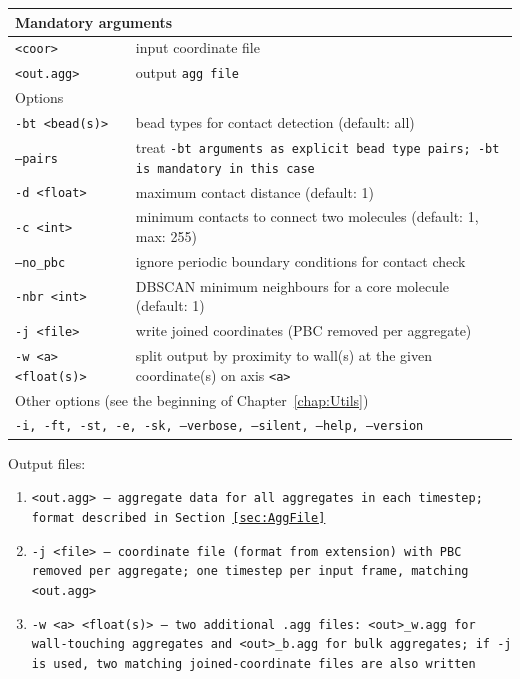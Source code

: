 \noindent
\begin{longtable}{p{}p{}}
  \toprule
  \multicolumn{2}{l}{Mandatory arguments}\\
  \midrule
  \tt{<coor>}            & input coordinate file\\
  \tt{<out.agg>}         & output \tt{agg} file\\
  \toprule
  \multicolumn{2}{l}{Options}\\
  \midrule
  \tt{-bt <bead(s)>}     & bead types for contact detection (default: all)\\
  \tt{--pairs}           & treat \tt{-bt} arguments as explicit bead type
                           pairs; \tt{-bt} is mandatory in this case\\
  \tt{-d <float>}        & maximum contact distance (default: 1)\\
  \tt{-c <int>}          & minimum contacts to connect two molecules
                           (default: 1, max: 255)\\
  \tt{--no_pbc}          & ignore periodic boundary conditions for contact
                           check\\
  \tt{-nbr <int>}        & DBSCAN minimum neighbours for a core molecule
                           (default: 1)\\
  \tt{-j <file>}         & write joined coordinates (PBC removed per
                           aggregate)\\
  \tt{-w <a> <float(s)>} & split output by proximity to wall(s) at the given
                           coordinate(s) on axis \tt{<a>}\\
  \midrule
  \multicolumn{2}{l}{Other options (see the beginning of
                     Chapter~\ref{chap:Utils})}\\
  \midrule
  \multicolumn{2}{p{0.948\textwidth}}{\tt{-i},
                     \tt{-ft},
                     \tt{-st},
                     \tt{-e},
                     \tt{-sk},
                     \tt{--verbose},
                     \tt{--silent},
                     \tt{--help},
                     \tt{--version}}\\
  \bottomrule
\end{longtable}

\noindent
Output files:
\begin{enumerate}[nosep,leftmargin=20pt]
  \item \tt{<out.agg>} -- aggregate data for all aggregates in each timestep;
    format described in Section~\ref{sec:AggFile}
  \item \tt{-j <file>} -- coordinate file (format from extension) with PBC
    removed per aggregate; one timestep per input frame, matching
    \tt{<out.agg>}
  \item \tt{-w <a> <float(s)>} -- two additional \tt{.agg} files:
    \tt{<out>\_w.agg} for wall-touching aggregates and \tt{<out>\_b.agg} for
    bulk aggregates; if \tt{-j} is used, two matching joined-coordinate files
    are also written
\end{enumerate}

